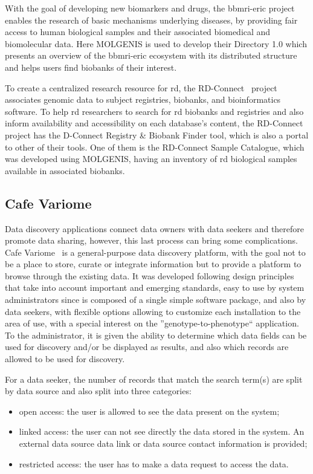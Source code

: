 With the goal of developing new biomarkers and drugs, the \gls{bbmri-eric} project~\cite{bbmrieric} enables the research of basic mechanisms underlying diseases, by providing fair access to human biological samples and their associated biomedical and biomolecular data.
Here MOLGENIS is used to develop their Directory 1.0 which presents an overview of the \gls{bbmri-eric} ecosystem with its distributed structure and helps users find biobanks of their interest.

To create a centralized research resource for \gls{rd}, the RD-Connect~\cite{rdconnect} project associates genomic data to subject registries, biobanks, and bioinformatics software.
To help \gls{rd} researchers to search for \gls{rd} biobanks and registries and also inform availability and accessibility on each database's content, the RD-Connect project has the D-Connect Registry \& Biobank Finder tool, which is also a portal to other of their tools. One of them is the RD-Connect Sample Catalogue, which was developed using MOLGENIS, having an inventory of \gls{rd} biological samples available in associated biobanks.

\subsection*{Cafe Variome}
Data discovery applications connect data owners with data seekers and therefore promote data sharing, however, this last process can bring some complications.
Cafe Variome~\cite{cafevariome} is a general-purpose data discovery platform, with the goal not to be a place to store, curate or integrate information but to provide a platform to browse through the existing data.
It was developed following design principles that take into account important and emerging standards, easy to use by system administrators since is composed of a single simple software package, and also by data seekers, with flexible options allowing to customize each installation to the area of use, with a special interest on the  ''genotype-to-phenotype`` application.
To the administrator, it is given the ability to determine which data fields can be used for discovery and/or be displayed as results, and also which records are allowed to be used for discovery.

For a data seeker, the number of records that match the search term(s) are split by data source and also split into three categories:
\begin{itemize}
    \item open access: the user is allowed to see the data present on the system;
    \item linked access: the user can not see directly the data stored in the system.
        An external data source data link or data source contact information is provided;
    \item restricted access: the user has to make a data request to access the data.
\end{itemize}

